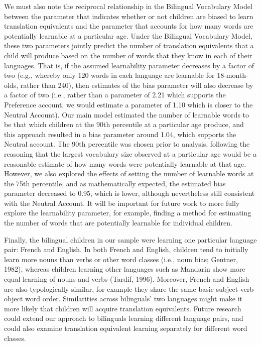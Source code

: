 \documentclass[
  english,
  ,man,floatsintext]{apa6}
\begin{document}
We must also note the reciprocal relationship in the Bilingual Vocabulary Model between the parameter that indicates whether or not children are biased to learn translation equivalents and the parameter that accounts for how many words are potentially learnable at a particular age. Under the Bilingual Vocabulary Model, these two parameters jointly predict the number of translation equivalents that a child will produce based on the number of words that they know in each of their languages. That is, if the assumed learnability parameter decreases by a factor of two (e.g., whereby only 120 words in each language are learnable for 18-month-olds, rather than 240), then estimates of the bias parameter will also decrease by a factor of two (i.e., rather than a parameter of 2.21 which supports the Preference account, we would estimate a parameter of 1.10 which is closer to the Neutral Account). Our main model estimated the number of learnable words to be that which children at the 90th percentile at a particular age produce, and this approach resulted in a bias parameter around 1.04, which supports the Neutral account. The 90th percentile was chosen prior to analysis, following the reasoning that the largest vocabulary size observed at a particular age would be a reasonable estimate of how many words were potentially learnable at that age. However, we also explored the effects of setting the number of learnable words at the 75th percentile, and as mathematically expected, the estimated bias parameter decreased to 0.95, which is lower, although nevertheless still consistent with the Neutral Account. It will be important for future work to more fully explore the learnability parameter, for example, finding a method for estimating the number of words that are potentially learnable for individual children.

Finally, the bilingual children in our sample were learning one particular language pair: French and English. In both French and English, children tend to initially learn more nouns than verbs or other word classes (i.e., noun bias; Gentner, 1982), whereas children learning other languages such as Mandarin show more equal learning of nouns and verbs (Tardif, 1996). Moreover, French and English are also typologically similar, for example they share the same basic subject-verb-object word order. Similarities across bilinguals' two languages might make it more likely that children will acquire translation equivalents. Future research could extend our approach to bilinguals learning different language pairs, and could also examine translation equivalent learning separately for different word classes.
\end{document}
